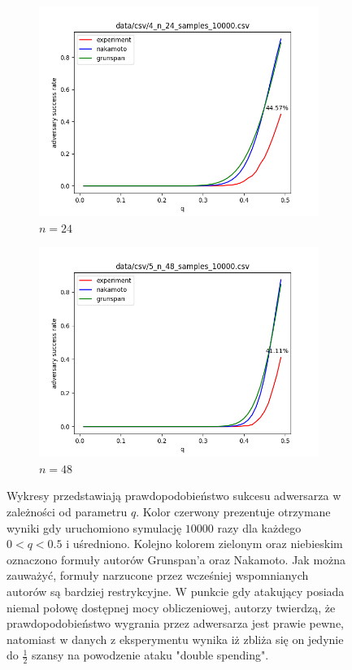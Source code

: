 \documentclass[a4paper,11pt]{article}
\theoremstyle{mytheor}
\begin{document}
\begin{figure}[H]
    \begin{subfigure}{0.5\textwidth}
        \includegraphics[width=1.0\linewidth]{4_n_24_samples_10000.png}
        \caption{$n = 24$}
        \label{fig:subim5}
    \end{subfigure}
    \begin{subfigure}{0.5\textwidth}
        \includegraphics[width=1.0\linewidth]{5_n_48_samples_10000.png}
        \caption{$n = 48$}
        \label{fig:subim6}
    \end{subfigure}

    \caption{\footnotesize Wykresy przedstawiają prawdopodobieństwo sukcesu adwersarza w zależności od parametru $q$. Kolor {\color{red} czerwony} prezentuje otrzymane wyniki gdy uruchomiono symulację $10000$ razy dla każdego $0 < q < 0.5$ i uśredniono. Kolejno kolorem {\color{green} zielonym} oraz {\color{blue} niebieskim} oznaczono formuły autorów Grunspan'a oraz Nakamoto. Jak można zauważyć, formuły narzucone przez wcześniej wspomnianych autorów są bardziej restrykcyjne. W punkcie gdy atakujący posiada niemal połowę dostępnej mocy obliczeniowej, autorzy twierdzą, że prawdopodobieństwo wygrania przez adwersarza jest prawie pewne, natomiast w danych z eksperymentu wynika iż zbliża się on jedynie do $\frac{1}{2}$ szansy na powodzenie ataku "double spending".}
    \label{fig:data1}
\end{figure}
\end{document}
